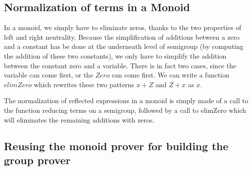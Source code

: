 \subsection {Normalization of terms in a Monoid}

In a monoid, we simply have to eliminate zeros, thanks to the two properties of left and right neutrality. Because the simplification of additions between a zero and a constant has be done at the underneath level of semigroup (by computing the addition of these two constants), we only have to simplify the addition between the constant zero and a variable. There is in fact two cases, since the variable can come first, or the $Zero$ can come first. We can write a function $elimZero$ which rewrites these two patterns $x+Z$ and $Z+x$ as $x$.


The normalization of reflected expressions in a monoid is simply made of a call to the function reducing terms on a semigroup, followed by a call to elimZero which will eliminates the remaining additions with zeros. 


\subsection {Reusing the monoid prover for building the group prover}


